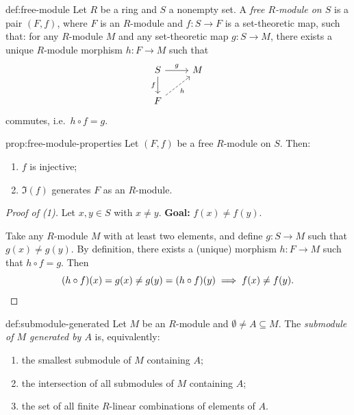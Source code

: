 \begin{definition}{}{def:free-module}
Let $R$ be a ring and $S$ a nonempty set. A \emph{free $R$-module on $S$} is a pair $(F, f)$, where $F$ is an $R$-module and $f: S \to F$ is a set-theoretic map, such that: for any $R$-module $M$ and any set-theoretic map $g: S \to M$, there exists a unique $R$-module morphism $h: F \to M$ such that
\[
\begin{tikzcd}
S \arrow[r, "g"] \arrow[d, "f"'] & M \\
F \arrow[ur, dashed, "h"'] &
\end{tikzcd}
\]
commutes, i.e.\ $h \circ f = g$.
\end{definition}

\begin{proposition}{}{prop:free-module-properties}
Let $(F, f)$ be a free $R$-module on $S$. Then:
\begin{enumerate}[label=(\arabic*)]
    \item $f$ is injective;
    \item $\Im(f)$ generates $F$ as an $R$-module.
\end{enumerate}
\end{proposition}

\begin{proof}[Proof of (1)]
Let $x, y \in S$ with $x \neq y$. \textbf{Goal:} $f(x) \neq f(y)$.

Take any $R$-module $M$ with at least two elements, and define $g: S \to M$ such that $g(x) \neq g(y)$. By definition, there exists a (unique) morphism $h: F \to M$ such that $h \circ f = g$. Then
\[
(h \circ f)(x) = g(x) \neq g(y) = (h \circ f)(y) \implies f(x) \neq f(y). \qedhere
\]
\end{proof}

\begin{definition}{}{def:submodule-generated}
Let $M$ be an $R$-module and $\emptyset \neq A \subseteq M$. The \emph{submodule of $M$ generated by $A$} is, equivalently:
\begin{enumerate}[label=(\arabic*)]
    \item the smallest submodule of $M$ containing $A$;
    \item the intersection of all submodules of $M$ containing $A$;
    \item the set of all finite $R$-linear combinations of elements of $A$.
\end{enumerate}
\end{definition}

